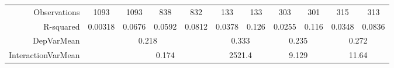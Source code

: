 \begin{tabular}{rrrrrrrrrrr}
      \midrule
Observations & \multicolumn{1}{c}{1093} & \multicolumn{1}{c}{1093} & \multicolumn{1}{c}{838} & \multicolumn{1}{c}{832} & \multicolumn{1}{c}{133} & \multicolumn{1}{c}{133} & \multicolumn{1}{c}{303} & \multicolumn{1}{c}{301} & \multicolumn{1}{c}{315} & \multicolumn{1}{c}{313} \\
R-squared & \multicolumn{1}{c}{0.00318} & \multicolumn{1}{c}{0.0676} & \multicolumn{1}{c}{0.0592} & \multicolumn{1}{c}{0.0812} & \multicolumn{1}{c}{0.0378} & \multicolumn{1}{c}{0.126} & \multicolumn{1}{c}{0.0255} & \multicolumn{1}{c}{0.116} & \multicolumn{1}{c}{0.0348} & \multicolumn{1}{c}{0.0836} \\
DepVarMean & \multicolumn{4}{c}{0.218}     & \multicolumn{2}{c}{0.333} & \multicolumn{2}{c}{0.235} & \multicolumn{2}{c}{0.272} \\
InteractionVarMean & \multicolumn{1}{c}{} & \multicolumn{3}{c}{0.174} & \multicolumn{2}{c}{2521.4} & \multicolumn{2}{c}{9.129} & \multicolumn{2}{c}{11.64} \\
\bottomrule
\end{tabular}%
